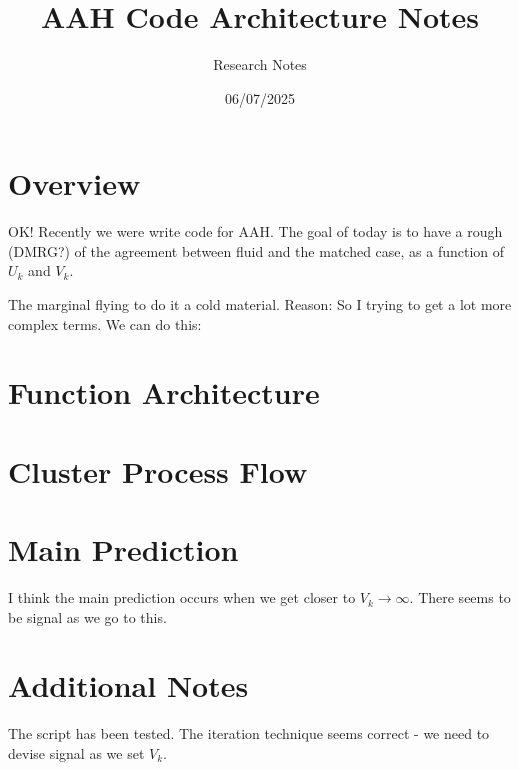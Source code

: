 \documentclass[11pt]{article}
\begin{document}
\title{AAH Code Architecture Notes}
\date{06/07/2025}
\author{Research Notes}
\maketitle

\section{Overview}

OK! Recently we were write code for AAH. The goal of today is to have a rough (DMRG?) of the agreement between fluid and the matched case, as a function of $U_k$ and $V_k$.

The marginal flying to do it a cold material. Reason: So I trying to get a lot more complex terms. We can do this:

\section{Function Architecture}


\section{Cluster Process Flow}


\section{Main Prediction}

I think the main prediction occurs when we get closer to $V_k \to \infty$. There seems to be signal as we go to this.

\section{Additional Notes}

The script has been tested. The iteration technique seems correct - we need to devise signal as we set $V_k$.
\end{document}
